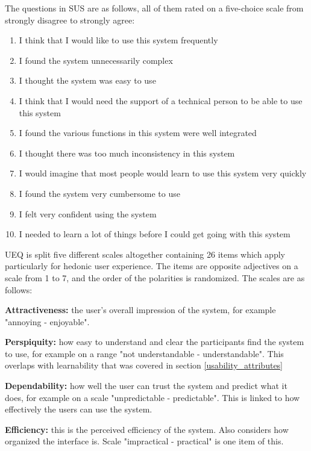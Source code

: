 The questions in SUS are as follows, all of them rated on a five-choice scale from strongly disagree to strongly agree:

\begin{enumerate}
\item I think that I would like to use this system frequently
\item I found the system unnecessarily complex
\item I thought the system was easy to use                      
\item I think that I would need the support of a technical person to be able to use this system
\item I found the various functions in this system were well integrated
\item I thought there was too much inconsistency in this system
\item I would imagine that most people would learn to use this system very quickly
\item I found the system very cumbersome to use
\item I felt very confident using the system
\item I needed to learn a lot of things before I could get going with this system 
\end{enumerate}

\cite{brooke1996sus}

UEQ is split five different scales altogether containing 26 items which apply particularly for hedonic user experience. The items are opposite adjectives on a scale from 1 to 7, and the order of the polarities is randomized. The scales are as follows:

\textbf{Attractiveness:} the user's overall impression of the system, for example "annoying - enjoyable".

\textbf{Perspiquity:} how easy to understand and clear the participants find the system to use, for example on a range "not understandable - understandable". This overlaps with learnability that was covered in section \ref{usability_attributes}

\textbf{Dependability:} how well the user can trust the system and predict what it does, for example on a scale "unpredictable - predictable". This is linked to how effectively the users can use the system.

\textbf{Efficiency:} this is the perceived efficiency of the system. Also considers how organized the interface is. Scale "impractical - practical" is one item of this.

